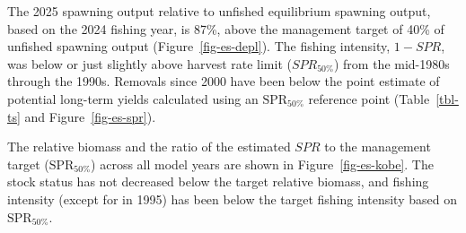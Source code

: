 \documentclass[
]{scrartcl}
\begin{document}
The 2025 spawning output relative to unfished equilibrium spawning
output, based on the 2024 fishing year, is 87\%, above the management
target of 40\% of unfished spawning output (Figure~\ref{fig-es-depl}).
The fishing intensity, \(1-SPR\), was below or just slightly above
harvest rate limit (\(SPR_{50\%}\)) from the mid-1980s through the
1990s. Removals since 2000 have been below the point estimate of
potential long-term yields calculated using an \(\text{SPR}_{50\%}\)
reference point (Table~\ref{tbl-ts} and Figure~\ref{fig-es-spr}).

The relative biomass and the ratio of the estimated \(SPR\) to the
management target (\(\text{SPR}_{50\%}\)) across all model years are
shown in Figure~\ref{fig-es-kobe}. The stock status has not decreased
below the target relative biomass, and fishing intensity (except for in
1995) has been below the target fishing intensity based on
\(\text{SPR}_{50\%}\).

\begingroup
\fontsize{9.0pt}{10.8pt}\selectfont
\end{document}
